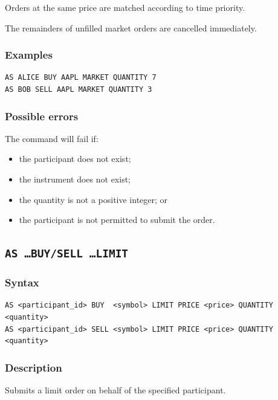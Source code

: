 \documentclass{article}
\begin{document}
Orders at the same price are matched according to time priority.

The remainders of unfilled market orders are cancelled immediately.

\subsubsection*{Examples}

\begin{lstlisting}
AS ALICE BUY AAPL MARKET QUANTITY 7
AS BOB SELL AAPL MARKET QUANTITY 3
\end{lstlisting}

\subsubsection*{Possible errors}

The command will fail if:

\begin{itemize}
    \item the participant does not exist;
    \item the instrument does not exist;
    \item the quantity is not a positive integer; or
    \item the participant is not permitted to submit the order.
\end{itemize}

\subsection{\texttt{AS \ldots BUY/SELL \ldots LIMIT}}

\subsubsection*{Syntax}

\begin{lstlisting}
AS <participant_id> BUY  <symbol> LIMIT PRICE <price> QUANTITY <quantity>
AS <participant_id> SELL <symbol> LIMIT PRICE <price> QUANTITY <quantity>
\end{lstlisting}

\subsubsection*{Description}

Submits a limit order on behalf of the specified participant.
\end{document}
